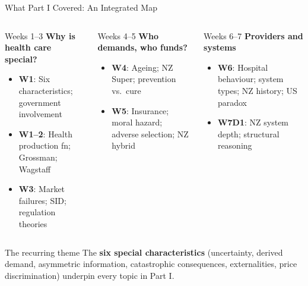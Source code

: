 \documentclass[aspectratio=169, 12pt]{beamer}
\begin{document}
\begin{frame}{What Part I Covered: An Integrated Map}
  \begin{columns}
      \begin{block}{Weeks 1--3}
        \footnotesize\textbf{Why is health care special?}
        \begin{itemize}\footnotesize
          \item \textbf{W1}: Six characteristics; government involvement
          \item \textbf{W1--2}: Health production fn; Grossman; Wagstaff
          \item \textbf{W3}: Market failures; SID; regulation theories
        \end{itemize}
      \end{block}
      \begin{block}{Weeks 4--5}
        \footnotesize\textbf{Who demands, who funds?}
        \begin{itemize}\footnotesize
          \item \textbf{W4}: Ageing; NZ Super; prevention vs.\ cure
          \item \textbf{W5}: Insurance; moral hazard; adverse selection; NZ hybrid
        \end{itemize}
      \end{block}
      \begin{alertblock}{Weeks 6--7}
        \footnotesize\textbf{Providers and systems}
        \begin{itemize}\footnotesize
          \item \textbf{W6}: Hospital behaviour; system types; NZ history; US paradox
          \item \textbf{W7D1}: NZ system depth; structural reasoning
        \end{itemize}
      \end{alertblock}
  \end{columns}
  \vspace{0.3em}
  \begin{exampleblock}{The recurring theme}
    \small The \textbf{six special characteristics} (uncertainty, derived demand, asymmetric information, catastrophic consequences, externalities, price discrimination) underpin every topic in Part I.
  \end{exampleblock}
\end{frame}
\end{document}
